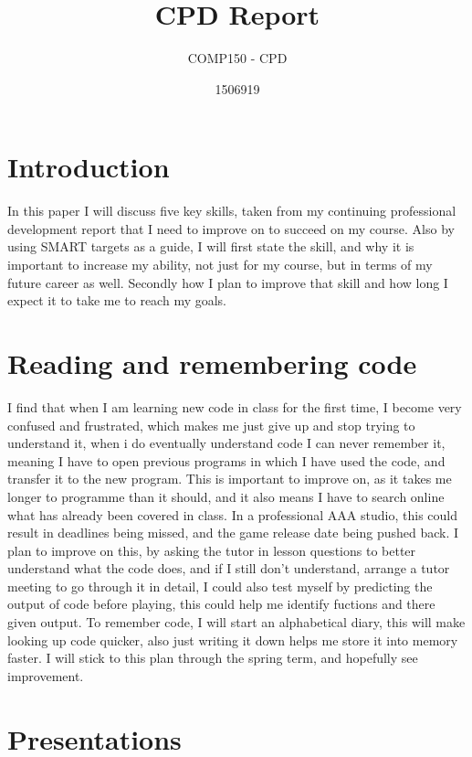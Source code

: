 \documentclass{scrartcl}
\title{CPD Report}
\subtitle{COMP150 - CPD}
\author{1506919}
\begin{document}
\maketitle

\section{Introduction}

In this paper I will discuss five key skills, taken from my continuing professional development report that I need to improve on to succeed on my course. Also by using SMART targets as a guide, I will first state the skill, and why it is important to increase my ability, not just for my course, but in terms of my future career as well. Secondly how I plan to improve that skill and how long I expect it to take me to reach my goals.

\section {Reading and remembering code}

I find that when I am learning new code in class for the first time, I become very confused and frustrated, which makes me just give up and stop trying to understand it, when i do eventually understand code I can never remember it, meaning I have to open previous programs in which I have used the code, and transfer it to the new program. This is important to improve on, as it takes me longer to programme than it should, and it also means I have to search online what has already been covered in class. In a professional AAA studio, this could result in deadlines being missed, and the game release date being pushed back. I plan to improve on this, by asking the tutor in lesson questions to better understand what the code does, and if I still don't understand, arrange a tutor meeting to go through it in detail, I could also test myself by predicting the output of code before playing, this could help me identify fuctions and there given output. To remember code, I will start an alphabetical diary, this will make looking up code quicker, also just writing it down helps me store it into memory faster. I will stick to this plan through the spring term, and hopefully see improvement.

\section {Presentations}
\end{document}
